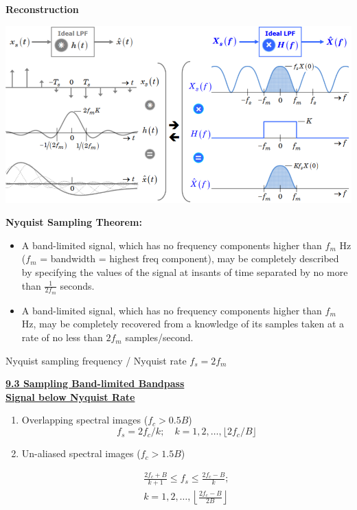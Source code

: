 \documentclass[landscape,a4paper]{extarticle}
\newenvironment{Figure}
  {\par\medskip\noindent\minipage{\linewidth}}
  {\endminipage\par\medskip}
\begin{document}
\begin{multicols*}{5}
    \textbf{Reconstruction}

    \begin{Figure}
        \centering
        \includegraphics[width=\linewidth]{reconstruction.png}        
    \end{Figure}

    \textbf{Nyquist Sampling Theorem:}
    \begin{itemize}
        \item A band-limited signal, which has no frequency components higher than $f_m$ Hz ($f_m$ = bandwidth = highest freq component), may be completely described by specifying the values of the signal at insants of time separated by no more than $\frac{1}{2f_m}$ seconds.
        \item A band-limited signal, which has no frequency components higher than $f_m$ Hz, may be completely recovered from a knowledge of its samples taken at a rate of no less than $2 f_m$ samples/second.
    \end{itemize}

    Nyquist sampling frequency / Nyquist rate $f_s = 2 f_m$

    \textbf{\uline{9.3 Sampling Band-limited Bandpass\\Signal below Nyquist Rate}}

    \begin{enumerate}[label=(\alph*)]
        \item Overlapping spectral images ($f_c > 0.5B$)
        \[
            f_s = 2f_c / k; \quad k = 1,2,\ldots, \lfloor 2f_c/B \rfloor \tag{9.2a}
        \]
        \item Un-aliased spectral images ($f_c > 1.5B$)

        \[
            \begin{split}
                \frac{2f_c + B}{k + 1} \leq f_s \leq \frac{2f_c - B}{k};\\
                k = 1,2,\ldots,\left\lfloor \frac{2f_c - B}{2B} \right\rfloor
            \end{split} \tag{9.2b}
        \]
    \end{enumerate}
\end{multicols*}
\end{document}
